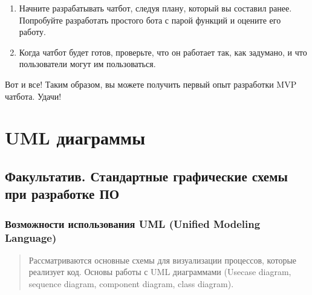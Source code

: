 \documentclass[letterpaper,10pt,russian]{sphinxmanual}
\begin{document}
\begin{enumerate}
\item {} 
\sphinxAtStartPar
Начните разрабатывать чат\sphinxhyphen{}бот, следуя плану, который вы составил ранее. Попробуйте разработать простого бота с парой функций и оцените его работу.

\item {} 
\sphinxAtStartPar
Когда чат\sphinxhyphen{}бот будет готов, проверьте, что он работает так, как задумано, и что пользователи могут им пользоваться.

\end{enumerate}

\sphinxAtStartPar
Вот и все! Таким образом, вы можете получить первый опыт разработки MVP чат\sphinxhyphen{}бота. Удачи!


\chapter{UML диаграммы}
\label{\detokenize{index:uml}}
\sphinxstepscope


\section{Факультатив. Стандартные графические схемы при разработке ПО}
\label{\detokenize{educational_materials/uml/content:id1}}\label{\detokenize{educational_materials/uml/content::doc}}

\subsection{Возможности использования UML (Unified Modeling Language)}
\label{\detokenize{educational_materials/uml/content:uml-unified-modeling-language}}
\sphinxAtStartPar
{}
\begin{quote}

\sphinxAtStartPar
Рассматриваются основные схемы для визуализации процессов, которые реализует код. Основы работы с UML диаграммами (Use\sphinxhyphen{}case diagram, sequence diagram, component diagram, class diagram).
\end{quote}
\end{document}
